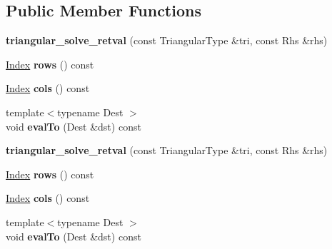 \subsection*{Public Member Functions}
\begin{DoxyCompactItemize}
\item 
\mbox{\label{struct_eigen_1_1internal_1_1triangular__solve__retval_a4e4b85d79cca2b2e64501aa0f32c0e80}} 
{\bfseries triangular\+\_\+solve\+\_\+retval} (const Triangular\+Type \&tri, const Rhs \&rhs)
\item 
\mbox{\label{struct_eigen_1_1internal_1_1triangular__solve__retval_ae644694588f13a50fb555299ba67cc34}} 
\hyperlink{namespace_eigen_a62e77e0933482dafde8fe197d9a2cfde}{Index} {\bfseries rows} () const
\item 
\mbox{\label{struct_eigen_1_1internal_1_1triangular__solve__retval_a366175697be9a8f69045d159f98a6af9}} 
\hyperlink{namespace_eigen_a62e77e0933482dafde8fe197d9a2cfde}{Index} {\bfseries cols} () const
\item 
\mbox{\label{struct_eigen_1_1internal_1_1triangular__solve__retval_a1fef0f91ac77d9580219dd69fe952862}} 
{\footnotesize template$<$typename Dest $>$ }\\void {\bfseries eval\+To} (Dest \&dst) const
\item 
\mbox{\label{struct_eigen_1_1internal_1_1triangular__solve__retval_a4e4b85d79cca2b2e64501aa0f32c0e80}} 
{\bfseries triangular\+\_\+solve\+\_\+retval} (const Triangular\+Type \&tri, const Rhs \&rhs)
\item 
\mbox{\label{struct_eigen_1_1internal_1_1triangular__solve__retval_ae644694588f13a50fb555299ba67cc34}} 
\hyperlink{namespace_eigen_a62e77e0933482dafde8fe197d9a2cfde}{Index} {\bfseries rows} () const
\item 
\mbox{\label{struct_eigen_1_1internal_1_1triangular__solve__retval_a366175697be9a8f69045d159f98a6af9}} 
\hyperlink{namespace_eigen_a62e77e0933482dafde8fe197d9a2cfde}{Index} {\bfseries cols} () const
\item 
\mbox{\label{struct_eigen_1_1internal_1_1triangular__solve__retval_a1fef0f91ac77d9580219dd69fe952862}} 
{\footnotesize template$<$typename Dest $>$ }\\void {\bfseries eval\+To} (Dest \&dst) const
\end{DoxyCompactItemize}
